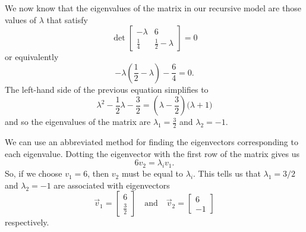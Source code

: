 \documentclass[../book.tex]{subfiles}
\begin{document}
We now know that the eigenvalues of the matrix in our recursive model are those values of \(\lambda\) that satisfy
\begin{equation}\label{eq:eig-30}
\det
\begin{bmatrix}
  -\lambda & 6 \\ \frac{1}{4} & \frac{1}{2} - \lambda
\end{bmatrix}
=0
\end{equation}
or equivalently
\begin{equation}\label{eq:eig-31}
-\lambda \left( \frac{1}{2} - \lambda \right) - \frac{6}{4} = 0.
\end{equation}
The left-hand side of the previous equation simplifies to
\begin{equation}\label{eq:eig-32}
\lambda^2 - \frac{1}{2} \lambda - \frac{3}{2} = 
\left(\lambda - \frac{3}{2}\right)\bigg(\lambda + 1\bigg) 
\end{equation}
and so the eigenvalues of the matrix are \(\lambda_1 = \frac{3}{2}\) and \(\lambda_2 = -1\).

We can use an abbreviated method for finding the eigenvectors corresponding to each eigenvalue. Dotting the eigenvector with the first row of the matrix gives us
\begin{equation}\label{eq:eig-33}
6 v_2 = \lambda_i  v_1.
\end{equation}
So, if we choose \(v_1 = 6\), then \(v_2\) must be equal to \(\lambda_i\). This tells us that \(\lambda_1 = 3/2\) and \(\lambda_2 = -1\) are associated with eigenvectors
\begin{equation}\label{eq:eig-34}
\vec{v}_1 = 
\begin{bmatrix}
  6 \\ \frac{3}{2}
\end{bmatrix}
\quad
\text{and}
\quad
\vec{v}_2 =
\begin{bmatrix}
  6 \\ -1
\end{bmatrix}
\end{equation}
respectively.
\end{document}
